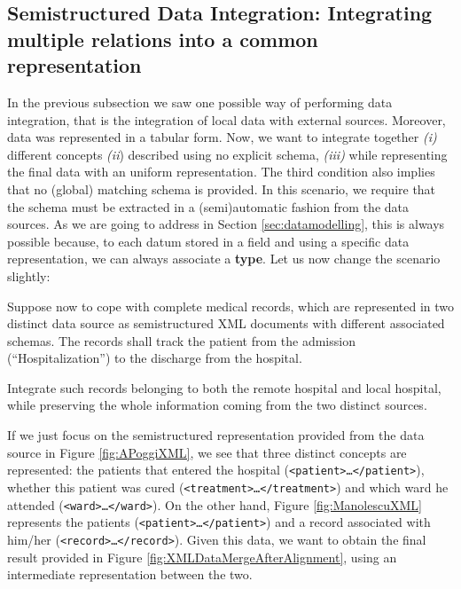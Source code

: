 \subsection{Semistructured Data Integration: Integrating multiple relations into a common representation}\label{sec:SDIIMRIACR}
In the previous subsection we saw one possible way of performing data integration, that is the integration of local data with external sources. Moreover, data was represented in a tabular form. Now, 
we want to integrate together \textit{(i)} different concepts \textit{(ii}) described using no explicit schema, \textit{(iii)} while representing the final data with an uniform representation. The third condition also implies that no (global) matching schema is provided. In this scenario, we require that the schema must be extracted in a (semi)automatic fashion from the data sources. As we are going to address in Section \ref{sec:datamodelling}, this is always possible because, to each datum stored in a field and using a specific data representation, we can always associate a \textbf{type}. 
Let us now change the scenario slightly:

\begin{example}
  Suppose now to cope with complete medical records, which are represented in two distinct data source as semistructured XML  documents with different associated schemas. The records shall track the patient from the admission (``Hospitalization'') to the discharge from the hospital. 
  
  Integrate such records belonging to both the remote hospital and  local hospital, while preserving the whole information coming from the two distinct sources.
  
 If we just focus on the semistructured representation provided from the data source in Figure \vref{fig:APoggiXML}, we  see that three distinct concepts are represented: the patients that entered the hospital (\texttt{<patient>\dots </patient>}), whether this patient was cured (\texttt{<treatment>\dots </treatment>}) and which ward he attended (\texttt{<ward>\dots</ward>}). On the other hand, Figure \ref{fig:ManolescuXML}  represents the patients (\texttt{<patient>\dots </patient>}) and a record associated with him/her (\texttt{<record>\dots</record>}). Given this data, we want to obtain the final result provided in Figure \vref{fig:XMLDataMergeAfterAlignment}, using an intermediate representation between the two.
\end{example}



